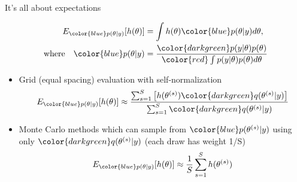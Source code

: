 \documentclass[english,t]{beamer}
\begin{document}
\begin{frame}

  {\Large\color{navyblue} It's all about expectations}

  \vspace{-1.5\baselineskip}
   \begin{align*}
     E_{\color{blue} p(\theta|y)}[h(\theta)] & = \int h(\theta) {\color{blue} p(\theta|y)} d\theta,\\
     \text{where} \quad
     {\color{blue} p(\theta|y)} & = \frac{\color{darkgreen}p(y|\theta)p(\theta)}{\color{red} \int p(y|\theta)p(\theta) d\theta}
   \end{align*}

 \begin{itemize}
   \vspace{-0.5\baselineskip}
    \item<4-> Grid (equal spacing) evaluation with self-normalization
      \begin{align*}
        E_{\color{blue} p(\theta|y)}[h(\theta)] \approx
        \frac{\sum_{s=1}^S \left[h(\theta^{(s)}){\color{darkgreen}q(\theta^{(s)}|y)}\right]}{\sum_{s=1}^S{\color{darkgreen}q(\theta^{(s)}|y)}}
      \end{align*}
    \item<5-> Monte Carlo methods which can sample from
      ${\color{blue}p(\theta^{(s)}|y)}$ using only
      ${\color{darkgreen}q(\theta^{(s)}|y)}$ {\color{gray}(each draw has weight 1/S)}
         \vspace{-0.5\baselineskip}
      \begin{align*}
        E_{\color{blue} p(\theta|y)}[h(\theta)] \approx \frac{1}{S} \sum_{s=1}^S h(\theta^{(s)})
      \end{align*}
    \end{itemize}
   
\end{frame}
\end{document}
